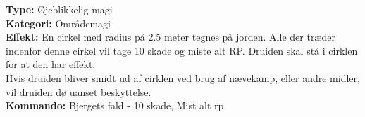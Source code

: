 \begin{nhævn*}
\textbf{Type:} Øjeblikkelig magi \\
\textbf{Kategori:} Områdemagi \\
\textbf{Effekt:} En cirkel med radius på 2.5 meter tegnes på jorden. Alle der træder indenfor denne cirkel vil tage 10 skade og miste alt RP. Druiden skal stå i cirklen for at den har effekt. \\
Hvis druiden bliver smidt ud af cirklen ved brug af nævekamp, eller andre midler, vil druiden dø uanset beskyttelse.\\
\textbf{Kommando:} Bjergets fald - 10 skade, Mist alt rp.
\end{nhævn*}